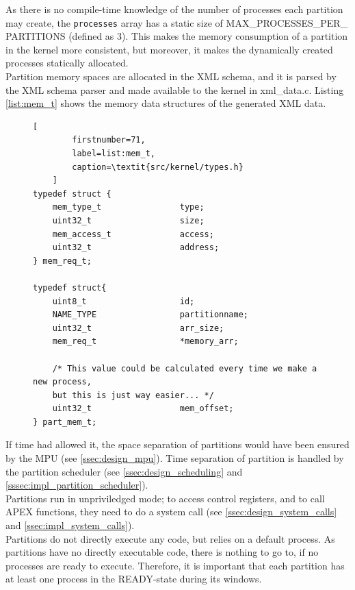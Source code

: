 As there is no compile-time knowledge of the number of processes each partition
may create, the \texttt{processes} array has a static size of
MAX\_PROCESSES\_PER\_ PARTITIONS (defined as 3). This makes the memory
consumption of a partition in the kernel more consistent, but moreover, it makes
the dynamically created processes statically allocated.\\

Partition memory spaces are allocated in the XML schema, and it is parsed by the
XML schema parser and made available to the kernel in xml\_data.c. Listing
\ref{list:mem_t} shows the memory data structures of the generated XML data.
\begin{figure}[H]
	\lstset{
		breaklines=true
	}
	\begin{lstlisting}[
		firstnumber=71,
		label=list:mem_t,
		caption=\textit{src/kernel/types.h}
	]
typedef struct {
    mem_type_t                type;
    uint32_t                  size;
    mem_access_t              access;
    uint32_t                  address;
} mem_req_t;

typedef struct{
    uint8_t                   id;
    NAME_TYPE                 partitionname;
    uint32_t                  arr_size;
    mem_req_t                 *memory_arr;

    /* This value could be calculated every time we make a new process,
    but this is just way easier... */
    uint32_t                  mem_offset;
} part_mem_t;
	\end{lstlisting}
\end{figure}
If time had allowed it, the space separation of partitions would have been
ensured by the MPU (see \ref{ssec:design_mpu}). Time separation of partition is
handled by the partition scheduler (see \ref{ssec:design_scheduling} and
\ref{sssec:impl_partition_scheduler}).\\

Partitions run in unpriviledged mode; to access control registers, and to call
APEX functions, they need to do a system call (see
\ref{ssec:design_system_calls} and \ref{ssec:impl_system_calls}).\\

Partitions do not directly execute any code, but relies on a default process. As
partitions have no directly executable code, there is nothing to go to, if no
processes are ready to execute. Therefore, it is important that each partition
has at least one process in the READY-state during its windows.

